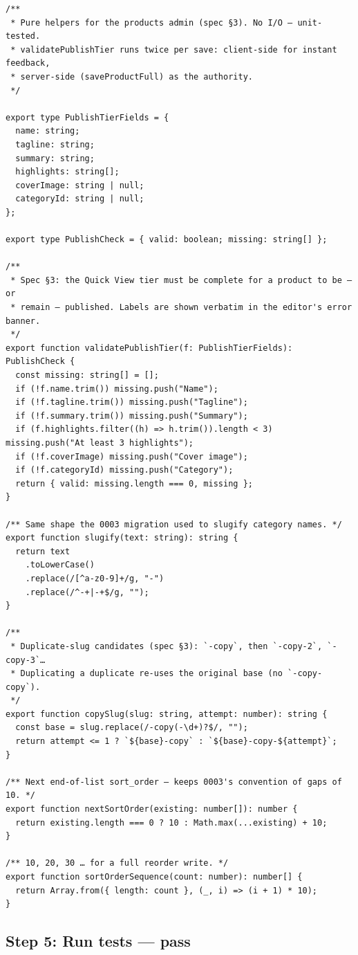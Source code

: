 \documentclass[11pt,a4paper]{article}
\begin{document}
\begin{lstlisting}
/**
 * Pure helpers for the products admin (spec §3). No I/O — unit-tested.
 * validatePublishTier runs twice per save: client-side for instant feedback,
 * server-side (saveProductFull) as the authority.
 */

export type PublishTierFields = {
  name: string;
  tagline: string;
  summary: string;
  highlights: string[];
  coverImage: string | null;
  categoryId: string | null;
};

export type PublishCheck = { valid: boolean; missing: string[] };

/**
 * Spec §3: the Quick View tier must be complete for a product to be — or
 * remain — published. Labels are shown verbatim in the editor's error banner.
 */
export function validatePublishTier(f: PublishTierFields): PublishCheck {
  const missing: string[] = [];
  if (!f.name.trim()) missing.push("Name");
  if (!f.tagline.trim()) missing.push("Tagline");
  if (!f.summary.trim()) missing.push("Summary");
  if (f.highlights.filter((h) => h.trim()).length < 3) missing.push("At least 3 highlights");
  if (!f.coverImage) missing.push("Cover image");
  if (!f.categoryId) missing.push("Category");
  return { valid: missing.length === 0, missing };
}

/** Same shape the 0003 migration used to slugify category names. */
export function slugify(text: string): string {
  return text
    .toLowerCase()
    .replace(/[^a-z0-9]+/g, "-")
    .replace(/^-+|-+$/g, "");
}

/**
 * Duplicate-slug candidates (spec §3): `-copy`, then `-copy-2`, `-copy-3`…
 * Duplicating a duplicate re-uses the original base (no `-copy-copy`).
 */
export function copySlug(slug: string, attempt: number): string {
  const base = slug.replace(/-copy(-\d+)?$/, "");
  return attempt <= 1 ? `${base}-copy` : `${base}-copy-${attempt}`;
}

/** Next end-of-list sort_order — keeps 0003's convention of gaps of 10. */
export function nextSortOrder(existing: number[]): number {
  return existing.length === 0 ? 10 : Math.max(...existing) + 10;
}

/** 10, 20, 30 … for a full reorder write. */
export function sortOrderSequence(count: number): number[] {
  return Array.from({ length: count }, (_, i) => (i + 1) * 10);
}
\end{lstlisting}

\subsection*{Step 5: Run tests --- pass}
\end{document}
